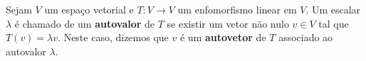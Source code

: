 \begin{definition}
	Sejam $V$ um espaço vetorial e $T\colon V\to V$ um enfomorfismo linear em $V$. Um escalar $\lambda$ é chamado de um \textbf{autovalor} de $T$ se existir um vetor não nulo $v\in V$ tal que $T(v)=\lambda v$. Neste caso, dizemos que $v$ é um \textbf{autovetor} de $T$ associado ao autovalor $\lambda$.
\end{definition}